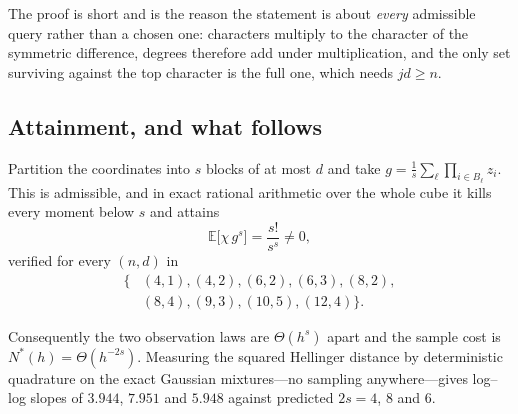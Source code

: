 
The proof is short and is the reason the statement is about \emph{every} admissible query
rather than a chosen one: characters multiply to the character of the symmetric difference,
degrees therefore add under multiplication, and the only set surviving against the top
character is the full one, which needs $jd\ge n$.


\subsection{Attainment, and what follows}

Partition the coordinates into $s$ blocks of at most $d$ and take
$g=\tfrac1s\sum_{\ell}\prod_{i\in B_{\ell}}z_{i}$. This is admissible, and in exact
rational arithmetic over the whole cube it kills every moment below $s$ and attains
\begin{equation}
\mathbb{E}\bigl[\chi\,g^{s}\bigr]=\frac{s!}{s^{s}}\neq0 ,
\label{eq:attain}
\end{equation}
verified for every $(n,d)$ in
\begin{equation*}
\begin{aligned}
\{&(4,1),(4,2),(6,2),(6,3),(8,2),\\
 &(8,4),(9,3),(10,5),(12,4)\}.
\end{aligned}
\end{equation*}
\CERT{}

Consequently the two observation laws are $\Theta(h^{s})$ apart and the sample cost is
$N^{*}(h)=\Theta(h^{-2s})$. Measuring the squared Hellinger distance by deterministic
quadrature on the exact Gaussian mixtures---no sampling anywhere---gives log--log slopes of
$3.944$, $7.951$ and $5.948$ against predicted $2s=4$, $8$ and $6$. \NUM{}


